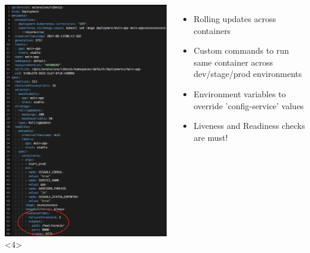 \documentclass[12pt]{beamer}
\begin{document}
\begin{frame}
\begin{columns}
\begin{center}
                \includegraphics[width=1\textwidth]{images/kubernetes-config-health.png}<4>
            \end{center}

            \begin{itemize}
                \item Rolling updates across containers
                \pause
                \item Custom commands to run same container across dev/stage/prod environments
                \pause
                \item Environment variables to override 'config-service' values
                \pause
                \item Liveness and Readiness checks are must!
            \end{itemize}
        \end{columns}
    \end{frame}
\end{document}
